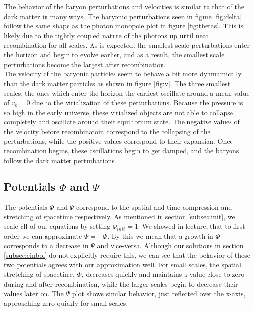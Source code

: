 \documentclass[a4paper]{article}
\begin{document}
The behavior of the baryon perturbations and velocities is similar to that of the dark matter in many ways. The baryonic perturbations seen in figure \ref{fig:delta} follow the same shape as the photon monopole plot in figure \ref{fig:thetas}. This is likely due to the tightly coupled nature of the photons up until near recombination for all scales. As is expected, the smallest scale perturbations enter the horizon and begin to evolve earlier, and as a result, the smallest scale perturbations become the largest after recombination.\\

The velocity of the baryonic particles seem to behave a bit more dynmamically than the dark matter particles as shown in figure \ref{fig:v}. The three smallest scales, the ones which enter the horizon the earliest oscillate around a mean value of $v_b = 0$ due to the virialization of these perturbations. Because the pressure is so high in the early universe, these virialized objects are not able to collapse completely and oscillate around their equilibrium state. The negative values of the velocity before recombinatoin correspond to the collapsing of the perturbations, while the positive values correspond to their expansion. Once recombination begins, these oscillations begin to get damped, and the baryons follow the dark matter perturbations.\\
\clearpage

\subsection{Potentials $\Phi$ and $\Psi$}

The potentials $\Phi$ and $\Psi$ correspond to the spatial and time compression and stretching of spacetime respectively. As mentioned in section \ref{subsec:init}, we scale all of our equations by setting $\Phi_{init} = 1$. We showed in lecture, that to first order we can approximate $\Psi = - \Phi$. By this we mean that a growth in $\Phi$ corresponds to a decrease in $\Psi$ and vice-versa. Although our solutions in section \ref{subsec:einbol} do not explicitly require this, we can see that the behavior of these two potentials agrees with our approximation well. For small scales, the spatial stretching of spacetime, $\Phi$, decreases quickly and maintains a value close to zero during and after recombination, while the larger scales begin to decrease their values later on. The $\Psi$ plot shows similar behavior, just reflected over the x-axis, approaching zero quickly for small scales.
\end{document}
